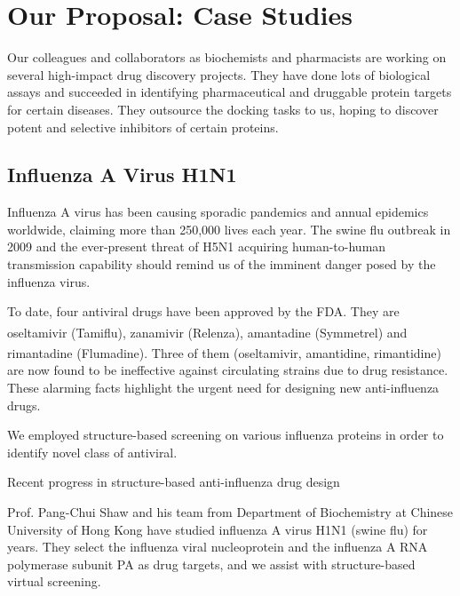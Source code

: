 \chapter{Our Proposal: Case Studies}

Our colleagues and collaborators as biochemists and pharmacists are working on several high-impact drug discovery projects. They have done lots of biological assays and succeeded in identifying pharmaceutical and druggable protein targets for certain diseases. They outsource the docking tasks to us, hoping to discover potent and selective inhibitors of certain proteins.

\section{Influenza A Virus H1N1}

Influenza A virus has been causing sporadic pandemics and annual epidemics worldwide, claiming more than 250,000 lives each year. The swine flu outbreak in 2009 and the ever-present threat of H5N1 acquiring human-to-human transmission capability should remind us of the imminent danger posed by the influenza virus.

To date, four antiviral drugs have been approved by the FDA. They are oseltamivir (Tamiflu\textsuperscript{\textregistered}), zanamivir (Relenza\textsuperscript{\textregistered}), amantadine (Symmetrel\textsuperscript{\textregistered}) and rimantadine (Flumadine\textsuperscript{\textregistered}). Three of them (oseltamivir, amantidine, rimantidine) are now found to be ineffective against circulating strains due to drug resistance. These alarming facts highlight the urgent need for designing new anti-influenza drugs.

We employed structure-based screening on various influenza proteins in order to identify novel class of antiviral.

Recent progress in structure-based anti-influenza drug design \citep{1229}

Prof. Pang-Chui Shaw and his team from Department of Biochemistry at Chinese University of Hong Kong have studied influenza A virus H1N1 (swine flu) for years. They select the influenza viral nucleoprotein and the influenza A RNA polymerase subunit PA as drug targets, and we assist with structure-based virtual screening.

